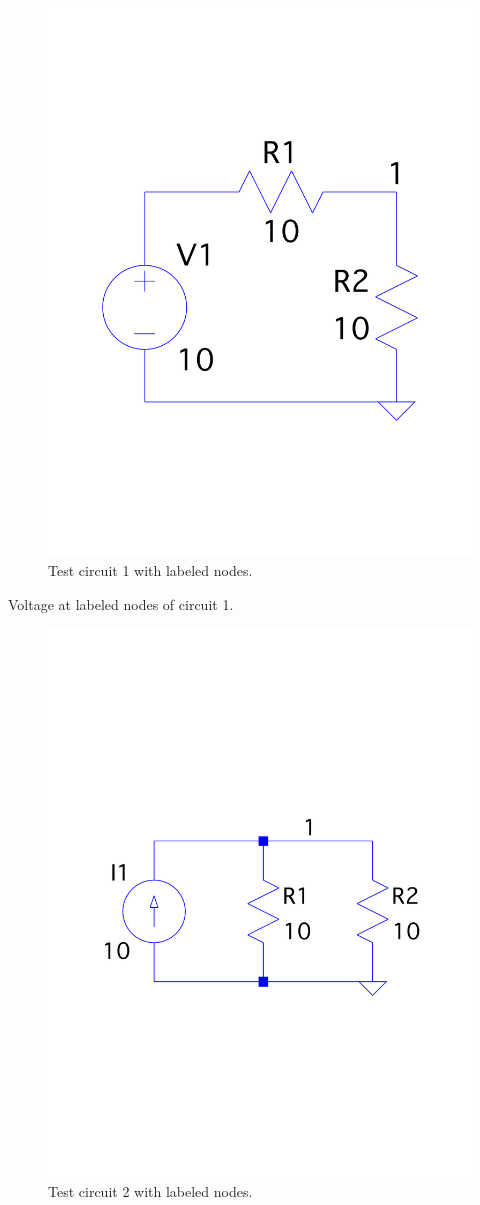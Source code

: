 \documentclass[a4paper,titlepage]{article}
\begin{document}
	
	\begin{figure}[!htb]
		\centering
		\includegraphics[width=0.5\columnwidth]{plots/q1_circuit_1.pdf}
		\caption
		{Test circuit 1 with labeled nodes.}
		\label{fig:q1_circuit_1}
	\end{figure}

	\begin{table}[!htb]
		\centering
		\caption{Voltage at labeled nodes of circuit 1.}
		\label{table:q1_circuit_1}
	\end{table}

	\begin{figure}[!htb]
		\centering
		\includegraphics[width=0.5\columnwidth]{plots/q1_circuit_2.pdf}
		\caption
		{Test circuit 2 with labeled nodes.}
		\label{fig:q1_circuit_2}
	\end{figure}
	
\end{document}
